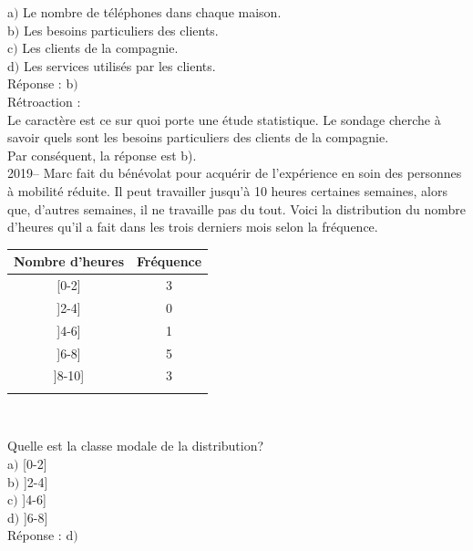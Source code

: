 \documentclass[letterpaper, 12pt]{article}
\begin{document}
a$)$ Le nombre de t\'el\'ephones dans chaque maison.\\
b$)$ Les besoins particuliers des clients.\\
c$)$ Les clients de la compagnie. \\
d$)$ Les services utilis\'es par les clients. \\

R\'eponse : b$)$\\

R\'etroaction :\\
Le caract\`ere est ce sur quoi porte une \'etude statistique. Le sondage cherche \`a savoir quels sont les besoins particuliers des clients de la compagnie.\\
Par cons\'equent, la r\'eponse est b).\\

2019--  Marc fait du b\'en\'evolat pour acqu\'erir de l'exp\'erience en soin des personnes \`a mobilit\'e r\'eduite.  Il peut travailler jusqu'\`a 10 heures certaines semaines, alors que, d'autres semaines, il ne travaille pas du tout. Voici la distribution du nombre d'heures qu'il a fait dans les trois derniers mois selon la fr\'equence.\\
\begin{center}
 \begin{tabular}{|c|c|} \hline
{\bf Nombre d'heures} & {\bf Fr\'equence}  \\ \hline \hline

[0-2] & 3 \\ \hline
]2-4] & 0 \\ \hline
]4-6] & 1 \\ \hline
]6-8] & 5 \\ \hline
]8-10] & 3 \\ \hline
\multicolumn{2}{c}{}\\
\end{tabular}\\
\end{center}


Quelle est la classe modale de la distribution?\\

a$)$ [0-2]\\ [2mm]
b$)$ ]2-4]\\[2mm]
c$)$ ]4-6]\\[2mm]
d$)$ ]6-8]\\

R\'eponse : d$)$\\
\end{document}

